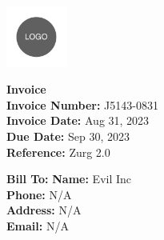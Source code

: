 \documentclass{article}
\begin{document}
\begin{minipage}{0.3\textwidth}
    \includegraphics[width=2cm]{aasd.jpg}  %
\end{minipage}%
\begin{minipage}{0.7\textwidth}
    \begin{flushright}
        \textbf{\LARGE Invoice}\\
        \textbf{Invoice Number:} J5143-0831\\
        \textbf{Invoice Date:} Aug 31, 2023\\
        \textbf{Due Date:} Sep 30, 2023\\
        \textbf{Reference:} Zurg 2.0
    \end{flushright}
\end{minipage}

\vspace{1cm}

\noindent
\textbf{Bill To:}
\textbf{Name:} Evil Inc\\
\textbf{Phone:} N/A\\
\textbf{Address:} N/A\\
\textbf{Email:} N/A

\vspace{1cm}
\end{document}
